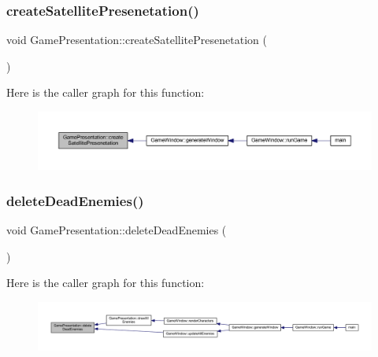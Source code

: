 \subsubsection{\texorpdfstring{create\+Satellite\+Presenetation()}{createSatellitePresenetation()}}
{\footnotesize\ttfamily void Game\+Presentation\+::create\+Satellite\+Presenetation (\begin{DoxyParamCaption}{ }\end{DoxyParamCaption})}

Here is the caller graph for this function\+:\nopagebreak
\begin{figure}[H]
\begin{center}
\leavevmode
\includegraphics[width=350pt]{class_game_presentation_a921823ce61d5c9a0db91098c8f055d28_icgraph}
\end{center}
\end{figure}
\mbox{\label{class_game_presentation_ae83bb9e0751f6077f2480a36dec36787}} 
\subsubsection{\texorpdfstring{delete\+Dead\+Enemies()}{deleteDeadEnemies()}}
{\footnotesize\ttfamily void Game\+Presentation\+::delete\+Dead\+Enemies (\begin{DoxyParamCaption}{ }\end{DoxyParamCaption})}

Here is the caller graph for this function\+:\nopagebreak
\begin{figure}[H]
\begin{center}
\leavevmode
\includegraphics[width=350pt]{class_game_presentation_ae83bb9e0751f6077f2480a36dec36787_icgraph}
\end{center}
\end{figure}
\mbox{\label{class_game_presentation_acc8d59152c26b9dddc84081c5a4483f2}} 
